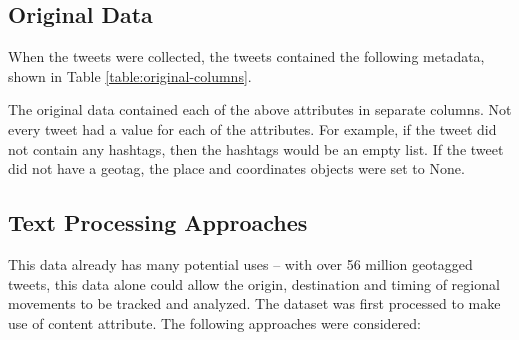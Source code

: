 \subsection{Original Data}

When the tweets were collected, the tweets contained the following metadata, shown in Table \ref{table:original-columns}.



The original data contained each of the above attributes in separate columns. Not every tweet had a value for each of the attributes. For example, if the tweet did not contain any hashtags, then the hashtags would be an empty list. If the tweet did not have a geotag, the {\selectfont place} and {\selectfont coordinates} objects were set to {\selectfont None}.

\subsection{Text Processing Approaches}

This data already has many potential uses – with over 56 million geotagged tweets, this data alone could allow the origin, destination and timing of regional movements to be tracked and analyzed. The dataset was first processed to make use of {\selectfont content} attribute. The following approaches were considered:

